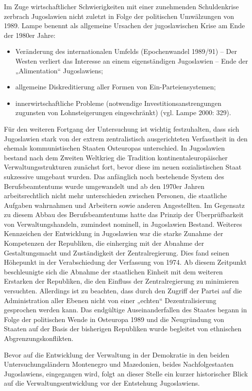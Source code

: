 Im Zuge wirtschaftlicher Schwierigkeiten mit einer zunehmenden Schuldenkrise zerbrach Jugoslawien nicht zuletzt in Folge der politischen Umwälzungen von 1989. Lampe benennt als allgemeine Ursachen der jugoslawischen Krise am Ende der 1980er Jahre:
\begin{itemize}
\item Veränderung des internationalen Umfelds (Epochenwandel 1989/91) – Der Westen verliert das Interesse an einem eigenständigen Jugoslawien – Ende der „Alimentation“ Jugoslawiens;
\item allgemeine Diskreditierung aller Formen von Ein-Parteiensystemen;
\item innerwirtschaftliche Probleme (notwendige Investitionsanstrengungen zugunsten von Lohnsteigerungen eingeschränkt) (vgl. Lampe 2000: 329).
\end{itemize}
Für den weiteren Fortgang der Untersuchung ist wichtig festzuhalten, dass sich Jugoslawien stark von der extrem zentralistisch ausgerichteten Verfasstheit in den ehemals kommunistischen Staaten Osteuropas unterschied. In Jugoslawien bestand nach dem Zweiten Weltkrieg die Tradition kontinentaleuropäischer Verwaltungsstrukturen zunächst fort, bevor diese im neuen sozialistischen Staat sukzessive umgebaut wurden. Das anfänglich noch bestehende System des Berufsbeamtentums wurde umgewandelt und ab den 1970er Jahren arbeitsrechtlich nicht mehr unterschieden zwischen Personen, die staatliche Aufgaben wahrnahmen und Arbeitern sowie anderen Angestellten. Im Gegensatz zu diesem Abbau des Berufsbeamtentums hatte das Prinzip der Überprüfbarkeit von Verwaltungshandeln, zumindest nominell, in Jugoslawien Bestand. Weiteres Kennzeichen der Entwicklung in Jugoslawien war die starke Zunahme der Kompetenzen der Republiken, die einherging mit der Abnahme der Gestaltungsmacht und Zuständigkeit der Zentralregierung. Dies fand seinen Höhepunkt in der Verabschiedung der Verfassung von 1974. Ab diesem Zeitpunkt beschleunigte sich die Abnahme der staatlichen Einheit mit dem weiteren Erstarken der Republiken, die den Einfluss der Zentralregierung zu minimieren versuchten. Allerdings ist zu beachten, dass durch den Zugriff der Partei auf die Administration aller Ebenen nicht von einer „echten“ Dezentralisierung gesprochen werden kann. Das endgültige Auseinanderfallen des Staates begann in Folge der politischen Wende in Osteuropa 1989 und die Neugründung von Staaten auf der Basis der bisherigen Republiken wurde begleitet von ethnischen Abgrenzungskonflikten. \par
Bevor auf die Entwicklung der Verwaltung in der Demokratie in den beiden Untersuchungsländern Montenegro und Mazedonien, beides Nachfolgestaaten Jugoslawiens, eingegangen wird, folgt an dieser Stelle ein kurzer historischer Blick auf die Verwaltungsentwicklung vor der Entstehung Jugoslawiens.\par
